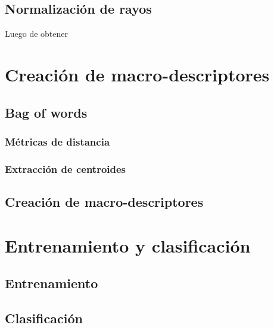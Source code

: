 	\subsection{Normalización de rayos}
	\label{algoritmo:normalizacion}
	Luego de obtener 	
	
\section{Creación de macro-descriptores}
\label{sec:macro-descriptores}

	\subsection{Bag of words}
	\label{algoritmo:bow}
		
		\subsubsection{Métricas de distancia}
		\label{algoritmo:metricas de distancia}
	
		\subsubsection{Extracción de centroides}
		\label{algoritmo:ext_centroides}
		
	\subsection{Creación de macro-descriptores}
	\label{algoritmo:crea_macro-descriptores}
	
\section{Entrenamiento y clasificación}
\label{sec:clasificacion}

	\subsection{Entrenamiento}
	\label{algoritmo:entrenamiento}
	
	\subsection{Clasificación}
	\label{algoritmo:clasificacion}
	
	
	
	
	
	
	